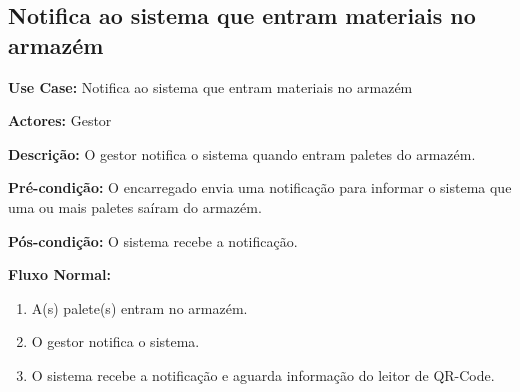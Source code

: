 \documentclass[a4paper]{report}
\begin{document}
\begin{enumerate}
\newpage

\section{Notifica ao sistema que entram materiais no armazém}

\textbf{Use Case:} Notifica ao sistema que entram materiais no armazém

\textbf{Actores:} Gestor

\textbf{Descrição:} O gestor notifica o sistema quando entram paletes do armazém.

\textbf{Pré-condição:} O encarregado envia uma notificação para informar o sistema que uma ou mais paletes saíram do armazém.

\textbf{Pós-condição:} O sistema recebe a notificação.

\textbf{Fluxo Normal:} 
\begin{enumerate}

    \item A(s) palete(s) entram no armazém.
    \item O gestor notifica o sistema.
    \item O sistema recebe a notificação e aguarda informação do leitor de QR-Code.
\end{enumerate}

\end{enumerate}
\end{document}
